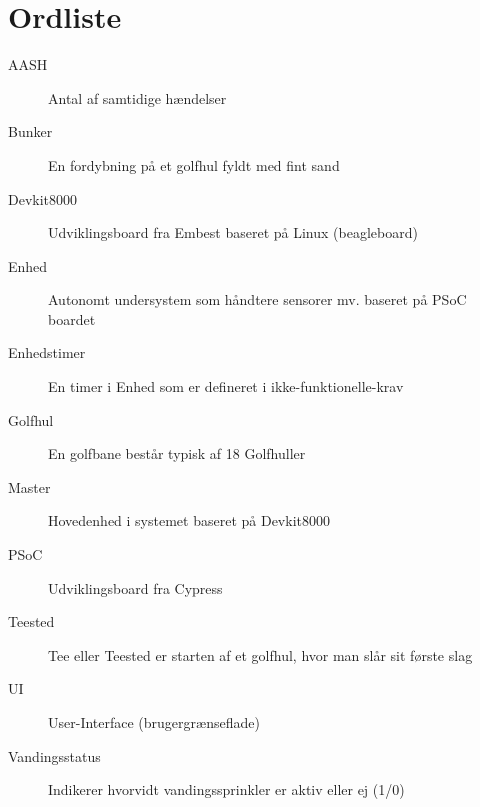 \chapter{Ordliste}


\begin{description}

\item[AASH] Antal af samtidige hændelser
\item[Bunker] En fordybning på et golfhul fyldt med fint sand
\item[Devkit8000] Udviklingsboard fra Embest baseret på Linux (beagleboard)
\item[Enhed] Autonomt undersystem som håndtere sensorer mv. baseret på PSoC boardet
\item[Enhedstimer] En timer i Enhed som er defineret i ikke-funktionelle-krav
\item[Golfhul] En golfbane består typisk af 18 Golfhuller 
\item[Master] Hovedenhed i systemet baseret på Devkit8000
\item[PSoC] Udviklingsboard fra Cypress
\item[Teested] Tee eller Teested er starten af et golfhul, hvor man slår sit første slag
\item[UI] User-Interface (brugergrænseflade)
\item[Vandingsstatus] Indikerer hvorvidt vandingssprinkler er aktiv eller ej (1/0)

\end{description}